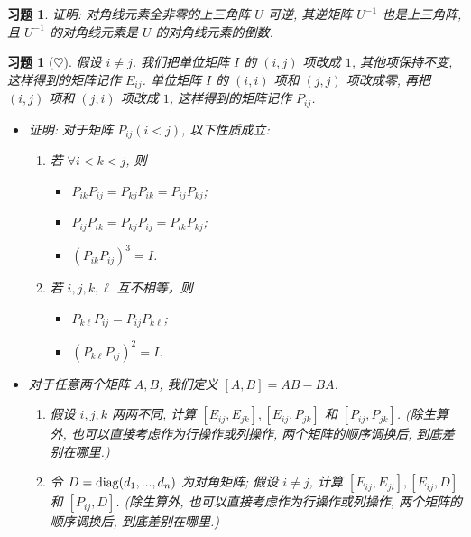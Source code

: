 \documentclass[UTF8]{ctexart}
\newtheorem{ex}[thm]{习题}
\begin{document}
\begin{ex}
证明: 对角线元素全非零的上三角阵 $U$ 可逆, 其逆矩阵 $U^{-1}$ 也是上三角阵,
且 $U^{-1}$ 的对角线元素是 $U$ 的对角线元素的倒数.
\end{ex}



 \begin{ex}[$\heartsuit $]
假设 $i\neq j$. 我们把单位矩阵 $I$ 的 $(i,j)$ 项改成 $1$, 其他项保持不变, 这样得到的矩阵记作 $E_{ij}$. 单位矩阵 $I$ 的 $(i,i)$ 项和 $(j,j)$ 项改成零, 再把 $(i,j)$ 项和 $(j,i)$ 项改成 $1$, 这样得到的矩阵记作 $P_{ij}$.
\begin{itemize}	
	\item[(a)] 证明: 对于矩阵 $P_{ij} (i<j)$, 以下性质成立:
	\begin{enumerate}
		\item 若 $\forall i<k<j$, 则
		\begin{itemize}
			\item $P_{ik}P_{ij}=P_{kj}P_{ik}=P_{ij}P_{kj}$;
			\item $P_{ij}P_{ik}=P_{kj}P_{ij}=P_{ik}P_{kj}$;
			\item $(P_{ik}P_{ij})^3=I$.
		\end{itemize}
		\item 若 $i,j,k,\ell$ 互不相等，则
		\begin{itemize}
			\item $P_{k\ell}P_{ij}=P_{ij}P_{k\ell}$;
			\item$(P_{k\ell}P_{ij})^2=I$.
		\end{itemize}
	\end{enumerate}
	
	\item[(b)] 对于任意两个矩阵 $A,B$, 我们定义 $[A,B]=AB-BA$.
	\begin{enumerate}
		\item 假设 $i,j,k$ 两两不同, 计算 $[E_{ij},E_{jk}], [E_{ij},P_{jk}]$ 和 $[P_{ij},P_{jk}]$. (除生算外, 也可以直接考虑作为行操作或列操作, 两个矩阵的顺序调换后, 到底差别在哪里.)
		\item 令 $D={\rm diag}(d_1,...,d_n)$ 为对角矩阵; 假设 $i\neq j$, 计算 $[E_{ij},E_{ji}], [E_{ij},D]$ 和 $[P_{ij},D]$. (除生算外, 也可以直接考虑作为行操作或列操作, 两个矩阵的顺序调换后, 到底差别在哪里.)
	\end{enumerate}
	\end{itemize}
\end{ex}
\end{document}
